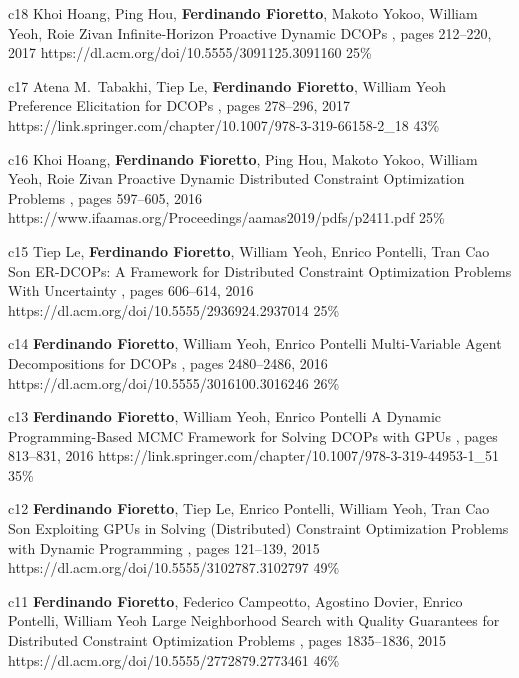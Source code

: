 \begin{pubs}
	\confentry
		{c18} %
		{Khoi Hoang, Ping Hou, {\bf Ferdinando Fioretto}, Makoto Yokoo, William Yeoh, Roie Zivan}
		{Infinite-Horizon Proactive Dynamic DCOPs}
		{\procAAMAS, pages 212--220, 2017}
		{https://dl.acm.org/doi/10.5555/3091125.3091160}
		{25\%}%

	\confentry 
		{c17} %
		{Atena M.~Tabakhi, Tiep Le, {\bf Ferdinando Fioretto}, William Yeoh}
		{Preference Elicitation for DCOPs}
		{\procCP, pages 278--296, 2017}
		{https://link.springer.com/chapter/10.1007/978-3-319-66158-2\_18}
		{43\%}%

	\confentry 
		{c16} %
		{Khoi Hoang, {\bf Ferdinando Fioretto}, Ping Hou, Makoto Yokoo, William Yeoh, Roie Zivan}
		{Proactive Dynamic Distributed Constraint Optimization Problems} 
		{\procAAMAS, pages 597--605, 2016}
		{https://www.ifaamas.org/Proceedings/aamas2019/pdfs/p2411.pdf}
		{25\%}%

	\confentry 
		{c15} %
		{Tiep Le, {\bf Ferdinando Fioretto}, William Yeoh, Enrico Pontelli, Tran Cao Son} 
		{ER-DCOPs: A Framework for Distributed Constraint Optimization Problems With Uncertainty} 
		{\procAAMAS,	pages 606--614, 2016}
		{https://dl.acm.org/doi/10.5555/2936924.2937014}
		{25\%}%

	\confentry 
		{c14} %
		{{\bf Ferdinando Fioretto}, William Yeoh, Enrico Pontelli}
		{Multi-Variable Agent Decompositions for DCOPs}
		{\procAAAI, pages 2480--2486, 2016}
		{https://dl.acm.org/doi/10.5555/3016100.3016246}
		{26\%}%

	\confentry
		{c13} %
		{{\bf Ferdinando Fioretto}, William Yeoh, Enrico Pontelli}
		{A Dynamic Programming-Based MCMC Framework for Solving DCOPs with GPUs}
		{\procCP, pages 813--831,	2016}
		{https://link.springer.com/chapter/10.1007/978-3-319-44953-1\_51}
		{35\%}%

	\confentry
		{c12} %
		{{\bf Ferdinando Fioretto}, Tiep Le, Enrico Pontelli, William Yeoh, Tran Cao Son}
		{Exploiting GPUs in Solving (Distributed) Constraint Optimization Problems with Dynamic Programming}
		{\procCP, pages 121--139, 2015}
		{https://dl.acm.org/doi/10.5555/3102787.3102797}
		{49\%}%

	\confentry
		{c11} %
		{{\bf Ferdinando Fioretto}, Federico Campeotto, Agostino Dovier, Enrico Pontelli, William Yeoh}
		{Large Neighborhood Search with Quality Guarantees for Distributed Constraint Optimization Problems}
		{\procAAMAS, pages 1835--1836, 2015}
		{https://dl.acm.org/doi/10.5555/2772879.2773461}
		{46\%}


\end{pubs}
